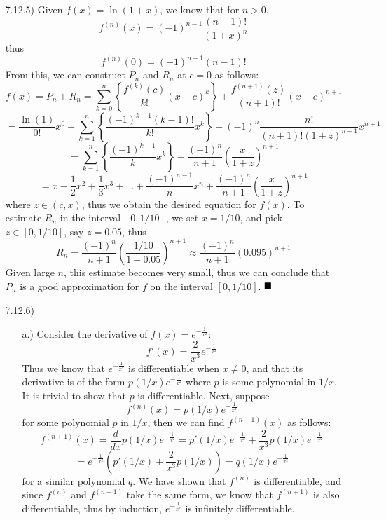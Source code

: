 \documentclass[11pt]{article}
\newcommand{\braces}[1]{\left\{#1\right\}}           %
\newcommand{\parens}[1]{\left(#1\right)}             %
\newcommand{\derv}[2]{\dfrac{d#1}{d#2}}
\begin{document}
\pagestyle{fancy}
\fancyhead{}

\normalsize

\begin{itemize}
    \item [7.12.5)] Given $f(x)=\ln(1+x)$, we know that for $n>0$,
    \[f^{(n)}(x)=(-1)^{n-1}\frac{(n-1)!}{(1+x)^n}\]
    thus
    \[f^{(n)}(0)=(-1)^{n-1}(n-1)!\]
    From this, we can construct $P_n$ and $R_n$ at $c=0$ as follows:
    \[f(x)=P_n+R_n=\sum_{k=0}^n\braces{\frac{f^{(k)}(c)}{k!}(x-c)^k}+\frac{f^{(n+1)}(z)}{(n+1)!}(x-c)^{n+1}\]
    \[=\frac{\ln(1)}{0!}x^0+\sum_{k=1}^n\braces{\frac{(-1)^{k-1}(k-1)!}{k!}x^k}+(-1)^{n}\frac{n!}{(n+1)!(1+z)^{n+1}}x^{n+1}\]
    \[=\sum_{k=1}^n\braces{\frac{(-1)^{k-1}}{k}x^k}+\frac{(-1)^n}{n+1}\parens{\frac{x}{1+z}}^{n+1}\]
    \[=x-\frac{1}{2}x^2+\frac{1}{3}x^3+\dots+\frac{(-1)^{n-1}}{n}x^n+\frac{(-1)^n}{n+1}\parens{\frac{x}{1+z}}^{n+1}\]
    where $z\in(c,x)$, thus we obtain the desired equation for $f(x)$. To estimate $R_n$ in the interval $[0,1/10]$, we set $x=1/10$, and pick $z\in[0,1/10]$, say $z=0.05$, thus
    \[R_n=\frac{(-1)^n}{n+1}\parens{\frac{1/10}{1+0.05}}^{n+1}\approx\frac{(-1)^n}{n+1}(0.095)^{n+1}\]
    Given large $n$, this estimate becomes very small, thus we can conclude that $P_n$ is a good approximation for $f$ on the interval $[0,1/10]$.
    $\newline\strut\hfill\blacksquare$

    \item [7.12.6)] \begin{itemize}
        \item [a.)] Consider the derivative of $f(x)=e^{-\frac{1}{x^2}}$:
        \[f'(x)=\frac{2}{x^3}e^{-\frac{1}{x^2}}\]
        Thus we know that $e^{-\frac{1}{x^2}}$ is differentiable when $x\ne0$, and that its derivative is of the form $p(1/x)e^{-\frac{1}{x^2}}$ where $p$ is some polynomial in $1/x$. It is trivial to show that $p$ is differentiable. Next, suppose
        \[f^{(n)}(x)=p(1/x)e^{-\frac{1}{x^2}}\]
        for some polynomial $p$ in $1/x$, then we can find $f^{(n+1)}(x)$ as follows:
        \[f^{(n+1)}(x)=\derv{}{x}p(1/x)e^{-\frac{1}{x^2}}=p'(1/x)e^{-\frac{1}{x^2}}+\frac{2}{x^3}p(1/x)e^{-\frac{1}{x^2}}\]
        \[=e^{-\frac{1}{x^2}}\parens{p'(1/x)+\frac{2}{x^3}p(1/x)}=q(1/x)e^{-\frac{1}{x^2}}\]
        for a similar polynomial $q$. We have shown that $f^{(n)}$ is differentiable, and since $f^{(n)}$ and $f^{(n+1)}$ take the same form, we know that $f^{(n+1)}$ is also differentiable, thus by induction, $e^{-\frac{1}{x^2}}$ is infinitely differentiable.


\end{itemize}
\end{itemize}
\end{document}
